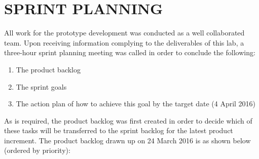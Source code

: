 \documentclass[10pt,twocolumn]{witseiepaper}
\begin{document}
	\section{SPRINT PLANNING}
	
	All work for the prototype development was conducted as a well collaborated team. Upon receiving information complying to the deliverables of this lab, a three-hour sprint planning meeting was called in order to conclude the following: 
	\begin{enumerate}
		\item The product backlog
		\item The sprint goals
		\item The action plan of how to achieve this goal by the target date (4 April 2016)
	\end{enumerate}
	
	As is required, the product backlog was first created in order to decide which of these tasks will be transferred to the sprint backlog for the latest product increment. The product backlog drawn up on 24 March 2016 is as shown below (ordered by priority):
	
\end{document}
